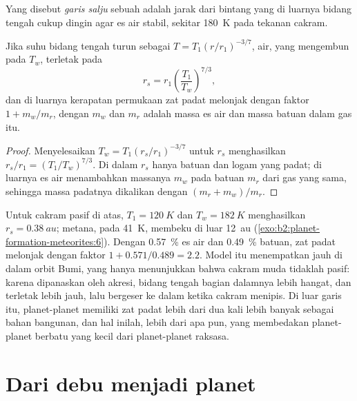 \begin{definition}\label{def:b2:planet-formation-meteorites:snow-line}
Yang disebut \emph{garis salju} sebuah  adalah jarak
dari bintang yang di luarnya bidang tengah cukup dingin agar es air
stabil, sekitar \qty{180}{K} pada tekanan cakram.
\end{definition}

\begin{proposition}
\label{prop:b2:planet-formation-meteorites:snow-line}
Jika suhu bidang tengah turun sebagai $T = T_1 (r/r_1)^{-3/7}$, 
air, yang mengembun pada $T_w$, terletak pada
\[
  r_s = r_1 \left(\frac{T_1}{T_w}\right)^{7/3},
\]
dan di luarnya kerapatan permukaan zat padat melonjak dengan faktor $1 + m_w/m_r$,
dengan $m_w$ dan $m_r$ adalah massa es air dan massa batuan dalam gas itu.
\end{proposition}

\begin{proof}
Menyelesaikan $T_w = T_1 (r_s/r_1)^{-3/7}$ untuk $r_s$ menghasilkan
$r_s/r_1 = (T_1/T_w)^{7/3}$. Di dalam $r_s$ hanya batuan dan logam yang padat; di luarnya
es air menambahkan massanya $m_w$ pada batuan $m_r$ dari gas yang sama, sehingga
massa padatnya dikalikan dengan $(m_r + m_w)/m_r$.
\end{proof}

Untuk cakram pasif di atas, $T_1 = \qty{120}{K}$ dan $T_w = \qty{182}{K}$ menghasilkan
$r_s = \qty{0.38}{au}$; metana, pada \qty{41}{K}, membeku di luar \qty{12}{au}
(\cref{exo:b2:planet-formation-meteorites:6}). Dengan \qty{0.57}{\percent} es air dan \qty{0.49}{\percent}
batuan, zat padat melonjak dengan faktor $1 + 0.571/0.489 = 2.2$. Model itu
menempatkan  jauh di dalam orbit Bumi, yang hanya menunjukkan bahwa
cakram muda tidaklah pasif: karena dipanaskan oleh akresi, bidang tengah bagian dalamnya lebih hangat,
dan  terletak lebih jauh, lalu bergeser ke dalam ketika cakram menipis. Di luar
garis itu, planet-planet memiliki zat padat lebih dari dua kali lebih banyak sebagai bahan bangunan, dan
hal inilah, lebih dari apa pun, yang membedakan planet-planet berbatu yang kecil dari
planet-planet raksasa.

\section{Dari debu menjadi planet}

